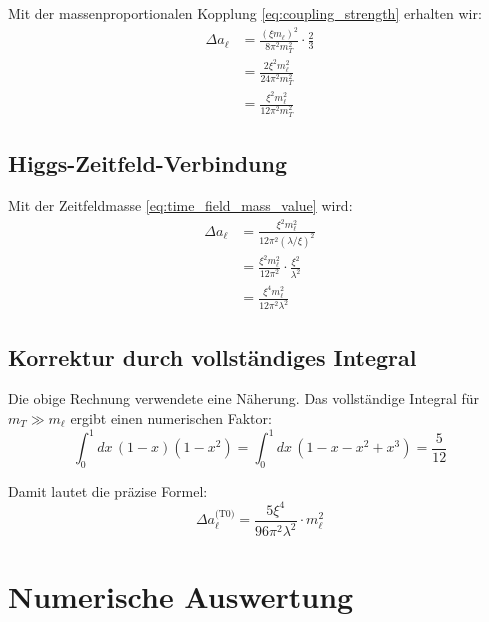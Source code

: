 	Mit der massenproportionalen Kopplung \eqref{eq:coupling_strength} erhalten wir:
	\begin{equation}
		\begin{split}
			\Delta a_\ell &= \frac{(\xi m_\ell)^2}{8\pi^2 m_T^2} \cdot \frac{2}{3} \\
			&= \frac{2 \xi^2 m_\ell^2}{24\pi^2 m_T^2} \\
			&= \frac{\xi^2 m_\ell^2}{12\pi^2 m_T^2}
		\end{split}
		\label{eq:t0_coupling_inserted}
	\end{equation}
	
	\subsection{Higgs-Zeitfeld-Verbindung}
	
	Mit der Zeitfeldmasse \eqref{eq:time_field_mass_value} wird:
	\begin{equation}
		\begin{split}
			\Delta a_\ell &= \frac{\xi^2 m_\ell^2}{12\pi^2 (\lambda/\xi)^2} \\
			&= \frac{\xi^2 m_\ell^2}{12\pi^2} \cdot \frac{\xi^2}{\lambda^2} \\
			&= \frac{\xi^4 m_\ell^2}{12\pi^2 \lambda^2}
		\end{split}
		\label{eq:higgs_connection_substituted}
	\end{equation}
	
	\subsection{Korrektur durch vollständiges Integral}
	
	Die obige Rechnung verwendete eine Näherung. Das vollständige Integral für $m_T \gg m_\ell$ ergibt einen numerischen Faktor:
	\begin{equation}
		\int_0^1 dx \, (1-x)(1-x^2) = \int_0^1 dx \, (1-x-x^2+x^3) = \frac{5}{12}
		\label{eq:full_integral}
	\end{equation}
	
	Damit lautet die präzise Formel:
	\begin{equation}
		\boxed{\Delta a_\ell^{\text{(T0)}} = \frac{5\xi^4}{96\pi^2\lambda^2} \cdot m_\ell^2}
		\label{eq:t0_fundamental_formula}
	\end{equation}
	
	\section{Numerische Auswertung}
	
